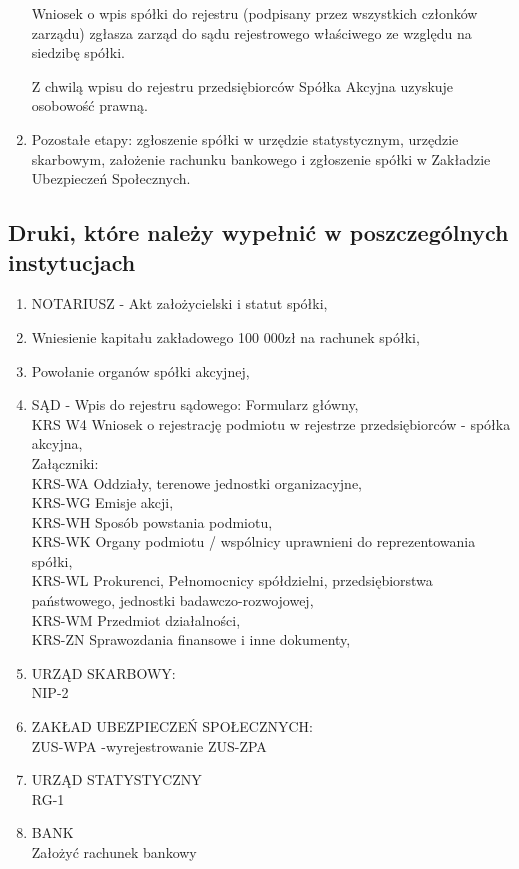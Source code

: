 \documentclass[a4paper, 11pt]{article}
\begin{document}
\begin{enumerate}
Wniosek o wpis spółki do rejestru (podpisany przez wszystkich członków zarządu) zgłasza zarząd do sądu rejestrowego właściwego ze względu na siedzibę spółki.
 
Z chwilą wpisu do rejestru przedsiębiorców Spółka Akcyjna uzyskuje osobowość prawną.

\item Pozostałe etapy:
zgłoszenie spółki w urzędzie statystycznym,
urzędzie skarbowym,
założenie rachunku bankowego i zgłoszenie spółki w Zakładzie Ubezpieczeń Społecznych.

\end{enumerate}

\subsection{Druki, które należy wypełnić w poszczególnych instytucjach}
\begin{enumerate}
\item NOTARIUSZ - Akt założycielski i statut spółki,
	
\item Wniesienie kapitału zakładowego 100 000zł na rachunek spółki,
\item Powołanie organów spółki akcyjnej,
\item SĄD - Wpis do rejestru sądowego: 
Formularz główny,\\
KRS W4 	Wniosek o rejestrację podmiotu w rejestrze przedsiębiorców - spółka akcyjna,\\
Załączniki:\\
KRS-WA Oddziały, terenowe jednostki organizacyjne,\\
KRS-WG 	Emisje akcji,\\
KRS-WH Sposób powstania podmiotu,\\
KRS-WK Organy podmiotu / wspólnicy uprawnieni do reprezentowania spółki,\\
KRS-WL 	Prokurenci, Pełnomocnicy spółdzielni, przedsiębiorstwa państwowego, jednostki badawczo-rozwojowej,\\
KRS-WM Przedmiot działalności,\\
KRS-ZN Sprawozdania finansowe i inne dokumenty,\\

\item URZĄD SKARBOWY:\\
	NIP-2
\item ZAKŁAD UBEZPIECZEŃ SPOŁECZNYCH:\\
 ZUS-WPA -wyrejestrowanie
	ZUS-ZPA
\item URZĄD STATYSTYCZNY\\
	RG-1
\item BANK\\
	Założyć rachunek bankowy
\end{enumerate}
\end{document}
